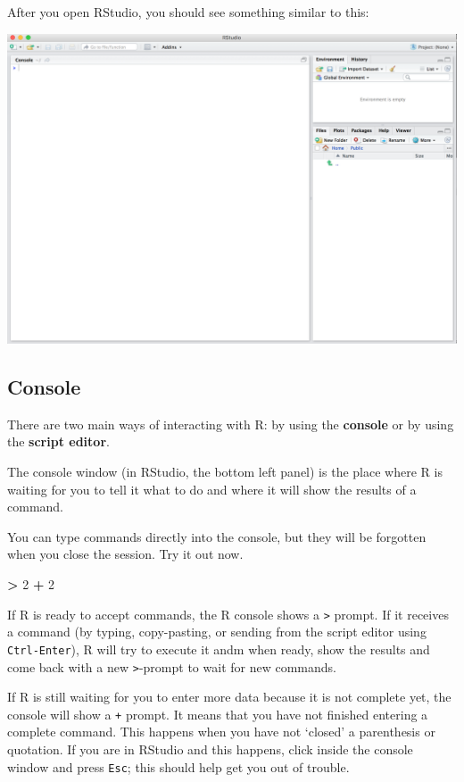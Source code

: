 \documentclass[
]{book}
\newenvironment{Shaded}{\begin{snugshade}}{\end{snugshade}}
\newcommand{\DecValTok}[1]{\textcolor[rgb]{0.00,0.00,0.81}{#1}}
\newcommand{\OperatorTok}[1]{\textcolor[rgb]{0.81,0.36,0.00}{\textbf{#1}}}
\newcommand{\StringTok}[1]{\textcolor[rgb]{0.31,0.60,0.02}{#1}}
\begin{document}
After you open RStudio, you should see something similar to this:

\begin{center}\includegraphics[width=0.7\linewidth]{img/rstudio} \end{center}

\hypertarget{console}{%
\subsection{Console}\label{console}}

There are two main ways of interacting with R: by using the \textbf{console} or by using the \textbf{script editor}.

The console window (in RStudio, the bottom left panel) is the place where R is waiting for you to tell it what to do and where it will show the results of a command.

You can type commands directly into the console, but they will be forgotten when you close the session. Try it out now.

\begin{Shaded}
\begin{Highlighting}[]
\OperatorTok{>}\StringTok{ }\DecValTok{2} \OperatorTok{+}\StringTok{ }\DecValTok{2}
\end{Highlighting}
\end{Shaded}

If R is ready to accept commands, the R console shows a \texttt{\textgreater{}} prompt. If it receives a command (by typing, copy-pasting, or sending from the script editor using \texttt{Ctrl-Enter}), R will try to execute it andm when ready, show the results and come back with a new \texttt{\textgreater{}}-prompt to wait for new commands.

If R is still waiting for you to enter more data because it is not complete yet, the console will show a \texttt{+} prompt. It means that you have not finished entering a complete command. This happens when you have not `closed' a parenthesis or quotation. If you are in RStudio and this happens, click inside the console window and press \texttt{Esc}; this should help get you out of trouble.
\end{document}
